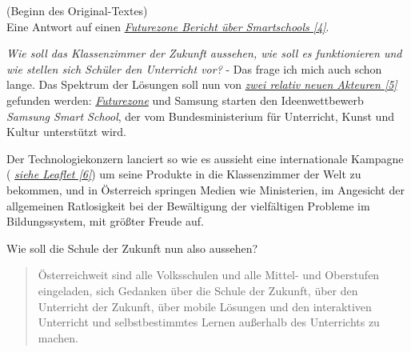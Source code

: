 \documentclass[10pt,a4paper,ngerman,twoside]{article} %
\begin{document}
\begin{multicols}{3}
(Beginn des Original-Textes)\\

Eine Antwort auf einen \href{http://futurezone.at/digital-life/ideenwettbewerb-einreichen-und-abstimmen/24.593.816}{\textit{Futurezone Bericht über Smartschools [4]}}.


\emph{Wie soll das Klassenzimmer der Zukunft aussehen, wie soll es funktionieren und wie stellen sich Schüler den Unterricht vor?} - Das frage ich mich auch schon lange. Das Spektrum der Lösungen soll nun von \href{http://futurezone.at/digitallife/14934-eboards-und-tablets-fuer-die-besten-ideen.php}{\textit{zwei relativ neuen Akteuren [5]}}  gefunden werden: \href{http://futurezone.at/}{\textit{Futurezone}} und Samsung starten den Ideenwettbewerb \emph{Samsung Smart School}, der vom Bundesministerium für Unterricht, Kunst und Kultur unterstützt wird.

Der Technologiekonzern lanciert so wie es aussieht eine internationale Kampagne ( \href{http://www.samsung.com/global/business/business-images/resource/RR-BC/2012/10/SamsungSmartSchoolLeaflet-0.pdf}{\textit{siehe Leaflet [6]}}) 
um seine Produkte in die Klassenzimmer der Welt zu bekommen, und in Österreich springen Medien wie Ministerien, im Angesicht der allgemeinen Ratlosigkeit bei der Bewältigung der vielfältigen Probleme im Bildungssystem, mit größter Freude auf.

Wie soll die Schule der Zukunft nun also aussehen?
\begin{quote}\glqq 
Österreichweit sind alle Volksschulen und alle Mittel- und Oberstufen eingeladen, sich Gedanken über die Schule der Zukunft, über den Unterricht der Zukunft, über mobile Lösungen und den interaktiven Unterricht und selbstbestimmtes Lernen außerhalb des Unterrichts zu machen.\grqq
\end{quote}


\end{multicols}
\end{document}
